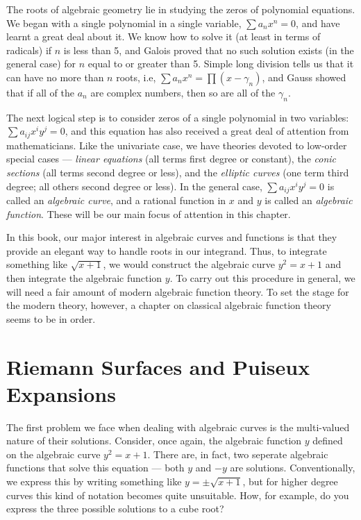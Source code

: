 

The roots of algebraic geometry lie in studying the zeros of
polynomial equations.  We began with a single polynomial in a single
variable, $\sum a_n x^n = 0$, and have learnt a great deal about
it.  We know how to solve it (at least in terms of radicals) if $n$ is
less than 5, and Galois proved that no such solution exists (in the
general case) for $n$ equal to or greater than 5.  Simple long
division tells us that it can have no more than $n$ roots, i.e, $\sum
a_n x^n = \prod (x-\gamma_n)$, and Gauss showed that if all of the
$a_n$ are complex numbers, then so are all of the $\gamma_n$.

The next logical step is to consider zeros of a single polynomial in
two variables: $\sum a_{ij} x^i y^j = 0$, and this equation has also
received a great deal of attention from mathematicians.  Like the
univariate case, we have theories devoted to low-order special cases
--- {\it linear equations} (all terms first degree or constant), the
{\it conic sections} (all terms second degree or less), and the {\it
elliptic curves} (one term third degree; all others second degree or
less).  In the general case, $\sum a_{ij} x^i y^j = 0$ is called an
{\it algebraic curve}, and a rational function in $x$ and $y$ is
called an {\it algebraic function}.  These will be our main focus of
attention in this chapter.

In this book, our major interest in algebraic curves and functions is
that they provide an elegant way to handle roots in our integrand.
Thus, to integrate something like $\sqrt{x+1}$, we would construct the
algebraic curve $y^2 = x + 1$ and then integrate the algebraic
function $y$.  To carry out this procedure in general, we will need a
fair amount of modern algebraic function theory.  To set the stage for
the modern theory, however, a chapter on classical algebraic function
theory seems to be in order.

\section{Riemann Surfaces and Puiseux Expansions}

The first problem we face when dealing with algebraic curves is the
multi-valued nature of their solutions.  Consider, once again, the
algebraic function $y$ defined on the algebraic curve $y^2 = x + 1$.
There are, in fact, two seperate algebraic functions that solve this
equation --- both $y$ and $-y$ are solutions.  Conventionally, we
express this by writing something like $y = \pm\sqrt{x+1}$, but for
higher degree curves this kind of notation becomes quite unsuitable.
How, for example, do you express the three possible solutions to a
cube root?

